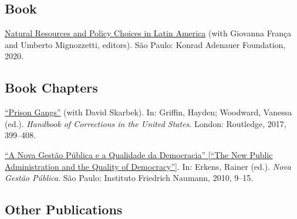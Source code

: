 \documentclass[a4paper]{article}
\renewenvironment{itemize}{
	\begin{list}{}{
			\setlength{\leftmargin}{1.5em}
		}
		}{
	\end{list}
}
\begin{document}
\subsection*{Book}

\begin{itemize}
\item \href{https://github.com/danilofreire/danilofreire.github.io/blob/01dc4c9566bb5ade15b5db950046ed0a386fc5f1/texts/natural_resources_policy_choices_latam.pdf}{Natural Resources and Policy Choices in Latin America} (with Giovanna França and Umberto Mignozzetti, editors). São Paulo: Konrad Adenauer Foundation, 2020.
\end{itemize}

\subsection*{Book Chapters}

\begin{itemize}
\item \href{https://osf.io/kuqqx/}{``Prison Gangs''} (with David Skarbek). In: Griffin, Hayden; Woodward, Vanessa (ed.). \textit{Handbook of Corrections in the United States}. London: Routledge, 2017, 399--408.
\item \href{https://fnst.org/sites/default/files/uploads/2017/12/08/ngp.pdf}{``A Nova Gest\~{a}o P\'{u}blica e a Qualidade da Democracia'' {[}``The New Public Administration and the Quality of Democracy''{]}}. In: Erkens, Rainer (ed.). \textit{Nova Gest\~{a}o P\'{u}blica}. S\~{a}o Paulo: Instituto Friedrich Naumann, 2010, 9--15.
\end{itemize}

\subsection*{Other Publications}
\end{document}
